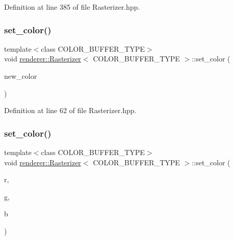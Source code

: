 Definition at line 385 of file Rasterizer.\+hpp.

\mbox{\label{classrenderer_1_1_rasterizer_af1f1a00ec1cc48a9a39e087c565b32fb}} 
\subsubsection{\texorpdfstring{set\_color()}{set\_color()}\hspace{0.1cm}{\footnotesize\ttfamily [1/2]}}
{\footnotesize\ttfamily template$<$class C\+O\+L\+O\+R\+\_\+\+B\+U\+F\+F\+E\+R\+\_\+\+T\+Y\+PE$>$ \\
void \mbox{\hyperlink{classrenderer_1_1_rasterizer}{renderer\+::\+Rasterizer}}$<$ C\+O\+L\+O\+R\+\_\+\+B\+U\+F\+F\+E\+R\+\_\+\+T\+Y\+PE $>$\+::set\+\_\+color (\begin{DoxyParamCaption}\item[{const \mbox{\hyperlink{classrenderer_1_1_rasterizer_a2f34497f55718e965d3ddc7fb9ef3fca}{Color}} \&}]{new\+\_\+color }\end{DoxyParamCaption})\hspace{0.3cm}{\ttfamily [inline]}}



Definition at line 62 of file Rasterizer.\+hpp.

\mbox{\label{classrenderer_1_1_rasterizer_a9bea840f9edbfe4c43dbc53cda17012f}} 
\subsubsection{\texorpdfstring{set\_color()}{set\_color()}\hspace{0.1cm}{\footnotesize\ttfamily [2/2]}}
{\footnotesize\ttfamily template$<$class C\+O\+L\+O\+R\+\_\+\+B\+U\+F\+F\+E\+R\+\_\+\+T\+Y\+PE$>$ \\
void \mbox{\hyperlink{classrenderer_1_1_rasterizer}{renderer\+::\+Rasterizer}}$<$ C\+O\+L\+O\+R\+\_\+\+B\+U\+F\+F\+E\+R\+\_\+\+T\+Y\+PE $>$\+::set\+\_\+color (\begin{DoxyParamCaption}\item[{int}]{r,  }\item[{int}]{g,  }\item[{int}]{b }\end{DoxyParamCaption})\hspace{0.3cm}{\ttfamily [inline]}}



